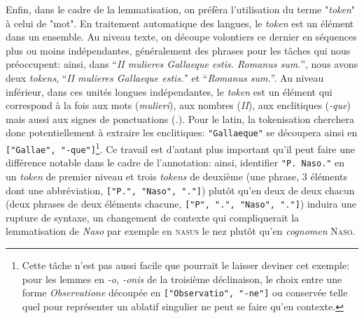 Enfin, dans le cadre de la lemmatisation, on préfèra l'utilisation du terme "\textit{token}" à celui de "mot". En traitement automatique des langues, le \textit{token} est un élément dans un ensemble. Au niveau texte, on découpe volontiers ce dernier en séquences plus ou moins indépendantes, généralement des phrases pour les tâches qui nous préoccupent: ainsi, dans ``\textit{II mulieres Gallaeque estis. Romanus sum.}'', nous avons deux \textit{tokens}, ``\textit{II mulieres Gallaeque estis.'}' et ``\textit{Romanus sum.}''. Au niveau inférieur, dans ces unités longues indépendantes, le \textit{token} est un élément qui correspond à la fois aux mots (\textit{mulieri}), aux nombres (\textit{II}), aux enclitiques (\textit{-que}) mais aussi aux signes de ponctuations (\textit{.}). Pour le latin, la tokenisation cherchera donc potentiellement à extraire les enclitiques: \texttt{"Gallaeque"} se découpera ainsi en \texttt{["Gallae", "-que"]}\footnote{Cette tâche n'est pas aussi facile que pourrait le laisser deviner cet exemple: pour les lemmes en \textit{-o, -onis} de la troisième déclinaison, le choix entre une forme \textit{Observatione} découpée en \texttt{["Observatio", "-ne"]} ou conservée telle quel pour représenter un ablatif singulier ne peut se faire qu'en contexte.}. Ce travail est d'autant plus important qu'il peut faire une différence notable dans le cadre de l'annotation: ainsi, identifier \texttt{"P. Naso."} en un \textit{token} de premier niveau et trois \textit{tokens} de deuxième (une phrase, 3 éléments dont une abbréviation, \texttt{["P.", "Naso", "."]}) plutôt qu'en deux de deux chacun (deux phrases de deux éléments chacune, \texttt{["P", ".", "Naso", "."]}) induira une rupture de syntaxe, un changement de contexte qui compliquerait la lemmatisation de \textit{Naso} par exemple en \textsc{nasus} le nez plutôt qu'en \textit{cognomen} \textsc{Naso}.

